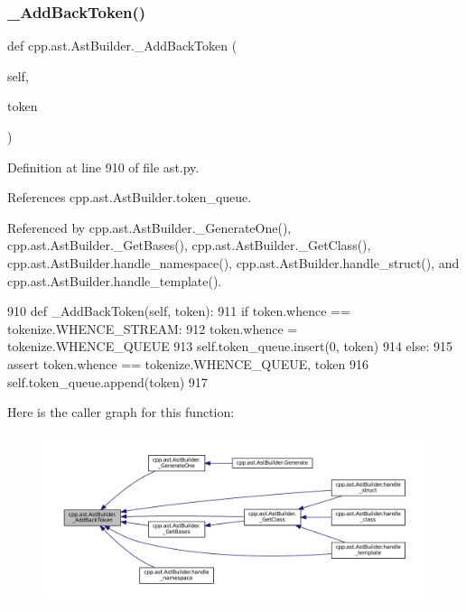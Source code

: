 \subsubsection{\texorpdfstring{\+\_\+\+Add\+Back\+Token()}{\_AddBackToken()}}
{\footnotesize\ttfamily def cpp.\+ast.\+Ast\+Builder.\+\_\+\+Add\+Back\+Token (\begin{DoxyParamCaption}\item[{}]{self,  }\item[{}]{token }\end{DoxyParamCaption})\hspace{0.3cm}{\ttfamily [private]}}



Definition at line 910 of file ast.\+py.



References cpp.\+ast.\+Ast\+Builder.\+token\+\_\+queue.



Referenced by cpp.\+ast.\+Ast\+Builder.\+\_\+\+Generate\+One(), cpp.\+ast.\+Ast\+Builder.\+\_\+\+Get\+Bases(), cpp.\+ast.\+Ast\+Builder.\+\_\+\+Get\+Class(), cpp.\+ast.\+Ast\+Builder.\+handle\+\_\+namespace(), cpp.\+ast.\+Ast\+Builder.\+handle\+\_\+struct(), and cpp.\+ast.\+Ast\+Builder.\+handle\+\_\+template().


\begin{DoxyCode}
910     \textcolor{keyword}{def }\_AddBackToken(self, token):
911         \textcolor{keywordflow}{if} token.whence == tokenize.WHENCE\_STREAM:
912             token.whence = tokenize.WHENCE\_QUEUE
913             self.token\_queue.insert(0, token)
914         \textcolor{keywordflow}{else}:
915             \textcolor{keyword}{assert} token.whence == tokenize.WHENCE\_QUEUE, token
916             self.token\_queue.append(token)
917 
\end{DoxyCode}
Here is the caller graph for this function\+:
\nopagebreak
\begin{figure}[H]
\begin{center}
\leavevmode
\includegraphics[width=350pt]{classcpp_1_1ast_1_1AstBuilder_a264b4e18c07863c4dae117fe623a0fb2_icgraph}
\end{center}
\end{figure}
\mbox{\label{classcpp_1_1ast_1_1AstBuilder_aa148966c6578f4560a4164db33df0fcf}} 

